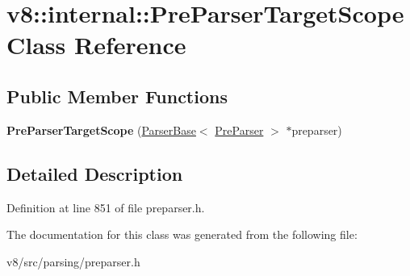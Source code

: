 \hypertarget{classv8_1_1internal_1_1PreParserTargetScope}{}\section{v8\+:\+:internal\+:\+:Pre\+Parser\+Target\+Scope Class Reference}
\label{classv8_1_1internal_1_1PreParserTargetScope}
\subsection*{Public Member Functions}
\begin{DoxyCompactItemize}
\item 
\mbox{\label{classv8_1_1internal_1_1PreParserTargetScope_a5592cbb64d02197b8e661319063cca1c}} 
{\bfseries Pre\+Parser\+Target\+Scope} (\mbox{\hyperlink{classv8_1_1internal_1_1ParserBase}{Parser\+Base}}$<$ \mbox{\hyperlink{classv8_1_1internal_1_1PreParser}{Pre\+Parser}} $>$ $\ast$preparser)
\end{DoxyCompactItemize}


\subsection{Detailed Description}


Definition at line 851 of file preparser.\+h.



The documentation for this class was generated from the following file\+:\begin{DoxyCompactItemize}
\item 
v8/src/parsing/preparser.\+h\end{DoxyCompactItemize}
